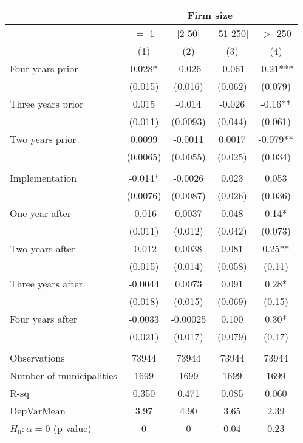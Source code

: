 \begin{tabular}{lcccc}
\toprule
      & \multicolumn{4}{c}{Firm size} \\
\midrule
      & $=$ 1 & [2-50] & [51-250] & $>$ 250 \\
\midrule
      & (1)   & (2)   & (3)   & (4) \\
\midrule
\midrule
Four years prior & 0.028* & -0.026 & -0.061 & -0.21*** \\
      & (0.015) & (0.016) & (0.062) & (0.079) \\
Three years prior & 0.015 & -0.014 & -0.026 & -0.16** \\
      & (0.011) & (0.0093) & (0.044) & (0.061) \\
Two years prior & 0.0099 & -0.0011 & 0.0017 & -0.079** \\
      & (0.0065) & (0.0055) & (0.025) & (0.034) \\
      &       &       &       &  \\
Implementation & -0.014* & -0.0026 & 0.023 & 0.053 \\
      & (0.0076) & (0.0087) & (0.026) & (0.036) \\
One year after & -0.016 & 0.0037 & 0.048 & 0.14* \\
      & (0.011) & (0.012) & (0.042) & (0.073) \\
Two years after & -0.012 & 0.0038 & 0.081 & 0.25** \\
      & (0.015) & (0.014) & (0.058) & (0.11) \\
Three years after & -0.0044 & 0.0073 & 0.091 & 0.28* \\
      & (0.018) & (0.015) & (0.069) & (0.15) \\
Four years after & -0.0033 & -0.00025 & 0.100 & 0.30* \\
      & (0.021) & (0.017) & (0.079) & (0.17) \\
      &       &       &       &  \\
\midrule
Observations & 73944 & 73944 & 73944 & 73944 \\
Number of municipalities & 1699  & 1699  & 1699  & 1699 \\
R-sq  & 0.350 & 0.471 & 0.085 & 0.060 \\
DepVarMean & 3.97  & 4.90  & 3.65  & 2.39 \\
$H_0 : \alpha = 0$ (p-value) & 0     & 0     & 0.04  & 0.23 \\
\bottomrule
\bottomrule
\end{tabular}%
